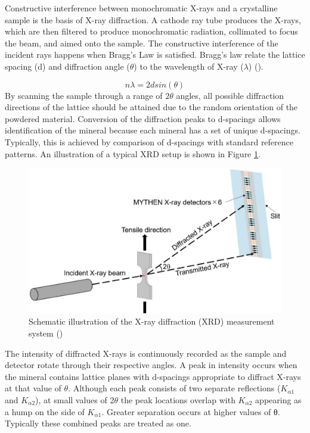 \documentclass{dhbenelux}
\begin{document}
Constructive interference between monochromatic X-rays and a crystalline sample is the basis of X-ray diffraction. A cathode ray tube produces the X-rays, which are then filtered to produce monochromatic radiation, collimated to focus the beam, and aimed onto the sample. The constructive interference of the incident rays happens when Bragg's Law is satisfied. Bragg's law relate the lattice spacing (d) and diffraction angle ($\theta$) to the wavelength of X-ray ($\lambda$) (\cite{XRD_Ref2}).

\[ n\lambda = 2dsin(\theta) \]
By scanning the sample through a range of $2\theta$ angles, all possible diffraction directions of the lattice should be attained due to the random orientation of the powdered material. Conversion of the diffraction peaks to d-spacings allows identification of the mineral because each mineral has a set of unique d-spacings. Typically, this is achieved by comparison of d-spacings with standard reference patterns. An illustration of a typical XRD setup is shown in Figure \ref{fig:XRD2}.

\begin{figure}[!h]
    \centering
    \includegraphics[scale=0.4]{XRD2.PNG}
    \caption{Schematic illustration of the X-ray diffraction (XRD) measurement system (\cite{cryst})}
    \label{fig:XRD2}
    
\end{figure}

 The intensity of diffracted X-rays is continuously recorded as the sample and detector rotate through their respective angles. A peak in intensity occurs when the mineral contains lattice planes with d-spacings appropriate to diffract X-rays at that value of $\theta$. Although each peak consists of two separate reflections ($K_{\alpha1}$ and $K_{\alpha2}$), at small values of 2$\theta$ the peak locations overlap with $K_{\alpha2}$ appearing as a hump on the side of $K_{\alpha1}$. Greater separation occurs at higher values of θ. Typically these combined peaks are treated as one. 
\end{document}
